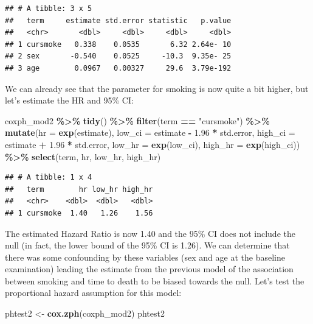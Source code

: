 \documentclass[
]{book}
\newenvironment{Shaded}{\begin{snugshade}}{\end{snugshade}}
\newcommand{\AttributeTok}[1]{\textcolor[rgb]{0.13,0.29,0.53}{#1}}
\newcommand{\FloatTok}[1]{\textcolor[rgb]{0.00,0.00,0.81}{#1}}
\newcommand{\FunctionTok}[1]{\textcolor[rgb]{0.13,0.29,0.53}{\textbf{#1}}}
\newcommand{\NormalTok}[1]{#1}
\newcommand{\OtherTok}[1]{\textcolor[rgb]{0.56,0.35,0.01}{#1}}
\newcommand{\SpecialCharTok}[1]{\textcolor[rgb]{0.81,0.36,0.00}{\textbf{#1}}}
\newcommand{\StringTok}[1]{\textcolor[rgb]{0.31,0.60,0.02}{#1}}
\begin{document}
\begin{verbatim}
## # A tibble: 3 x 5
##   term     estimate std.error statistic   p.value
##   <chr>       <dbl>     <dbl>     <dbl>     <dbl>
## 1 cursmoke   0.338    0.0535       6.32 2.64e- 10
## 2 sex       -0.540    0.0525     -10.3  9.35e- 25
## 3 age        0.0967   0.00327     29.6  3.79e-192
\end{verbatim}

We can already see that the parameter for smoking is now quite a bit higher, but let's estimate the HR and 95\% CI:

\begin{Shaded}
\begin{Highlighting}[]
\NormalTok{coxph\_mod2 }\SpecialCharTok{\%\textgreater{}\%} 
  \FunctionTok{tidy}\NormalTok{() }\SpecialCharTok{\%\textgreater{}\%} 
  \FunctionTok{filter}\NormalTok{(term }\SpecialCharTok{==} \StringTok{"cursmoke"}\NormalTok{) }\SpecialCharTok{\%\textgreater{}\%} 
  \FunctionTok{mutate}\NormalTok{(}\AttributeTok{hr =} \FunctionTok{exp}\NormalTok{(estimate),}
         \AttributeTok{low\_ci =}\NormalTok{ estimate }\SpecialCharTok{{-}} \FloatTok{1.96} \SpecialCharTok{*}\NormalTok{ std.error, }
         \AttributeTok{high\_ci =}\NormalTok{ estimate }\SpecialCharTok{+} \FloatTok{1.96} \SpecialCharTok{*}\NormalTok{ std.error, }
         \AttributeTok{low\_hr =} \FunctionTok{exp}\NormalTok{(low\_ci), }
         \AttributeTok{high\_hr =} \FunctionTok{exp}\NormalTok{(high\_ci)) }\SpecialCharTok{\%\textgreater{}\%} 
  \FunctionTok{select}\NormalTok{(term, hr, low\_hr, high\_hr)}
\end{Highlighting}
\end{Shaded}

\begin{verbatim}
## # A tibble: 1 x 4
##   term        hr low_hr high_hr
##   <chr>    <dbl>  <dbl>   <dbl>
## 1 cursmoke  1.40   1.26    1.56
\end{verbatim}

The estimated Hazard Ratio is now 1.40 and the 95\% CI does not include the null (in fact, the lower bound of the 95\% CI is 1.26). We can determine that there was some confounding by these variables (sex and age at the baseline examination) leading the estimate from the previous model of the association between smoking and time to death to be biased towards the null. Let's test the proportional hazard assumption for this model:

\begin{Shaded}
\begin{Highlighting}[]
\NormalTok{phtest2 }\OtherTok{\textless{}{-}} \FunctionTok{cox.zph}\NormalTok{(coxph\_mod2)}
\NormalTok{phtest2}
\end{Highlighting}
\end{Shaded}
\end{document}
